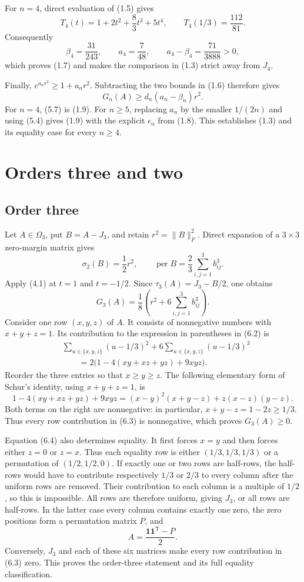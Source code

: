 \documentclass[11pt]{article}
\begin{document}
For $n=4$, direct evaluation of (1.5) gives
\[
T_4(t)=1+2t^2+\frac83t^3+5t^4,
\qquad
T_4(1/3)=\frac{112}{81}.
\]
Consequently
\[
\beta_4=\frac{31}{243},
\qquad
a_4=\frac7{48},
\qquad
a_4-\beta_4=\frac{71}{3888}>0,
\]
which proves (1.7) and makes the comparison in (1.3) strict away from $J_4$.

Finally, $e^{a_nr^2}\ge1+a_nr^2$. Subtracting the two bounds in (1.6)
therefore gives
\[
G_n(A)\ge d_n(a_n-\beta_n)r^2.
\tag{5.7}
\]
For $n=4$, (5.7) is (1.9). For $n\ge5$, replacing $a_n$ by the smaller
$1/(2n)$ and using (5.4) gives (1.9) with the explicit $\epsilon_n$ from
(1.8). This establishes (1.3) and its equality case for every $n\ge4$.

\section{Orders three and two}

\subsection{Order three}

Let $A\in\Omega_3$, put $B=A-J_3$, and retain
$r^2=\|B\|_F^2$. Direct expansion of a $3\times3$ zero-margin matrix gives
\[
\sigma_2(B)=\frac12r^2,
\qquad
\operatorname{per}B=\frac23\sum_{i,j=1}^3b_{ij}^3.
\tag{6.1}
\]
Apply (4.1) at $t=1$ and $t=-1/2$. Since
$\tau_3(A)=J_3-B/2$, one obtains
\[
G_3(A)=\frac18\left(r^2+6\sum_{i,j=1}^3b_{ij}^3\right).
\tag{6.2}
\]
Consider one row $(x,y,z)$ of $A$. It consists of nonnegative numbers with
$x+y+z=1$. Its contribution to the expression in parentheses in (6.2) is
\[
\begin{aligned}
&\sum_{u\in\{x,y,z\}}(u-1/3)^2
+6\sum_{u\in\{x,y,z\}}(u-1/3)^3\\
&\qquad=2\bigl(1-4(xy+xz+yz)+9xyz\bigr).
\end{aligned}
\tag{6.3}
\]
Reorder the three entries so that $x\ge y\ge z$. The following elementary
form of Schur's identity, using $x+y+z=1$, is
\[
1-4(xy+xz+yz)+9xyz
=(x-y)^2(x+y-z)+z(x-z)(y-z).
\tag{6.4}
\]
Both terms on the right are nonnegative: in particular,
$x+y-z=1-2z\ge1/3$. Thus every row contribution in (6.3) is nonnegative,
which proves $G_3(A)\ge0$.

Equation (6.4) also determines equality. It first forces $x=y$ and then
forces either $z=0$ or $z=x$. Thus each equality row is either
$(1/3,1/3,1/3)$ or a permutation of $(1/2,1/2,0)$. If exactly one or two
rows are half-rows, the half-rows would have to contribute respectively
$1/3$ or $2/3$ to every column after the uniform rows are removed. Their
contribution to each column is a multiple of $1/2$, so this is impossible.
All rows are therefore uniform, giving $J_3$, or all rows are half-rows. In
the latter case every column contains exactly one zero, the zero positions
form a permutation matrix $P$, and
\[
A=\frac{\mathbf1\mathbf1^{\mathsf T}-P}{2}.
\]
Conversely, $J_3$ and each of these six matrices make every row contribution
in (6.3) zero. This proves the order-three statement and its full equality
classification.
\end{document}
